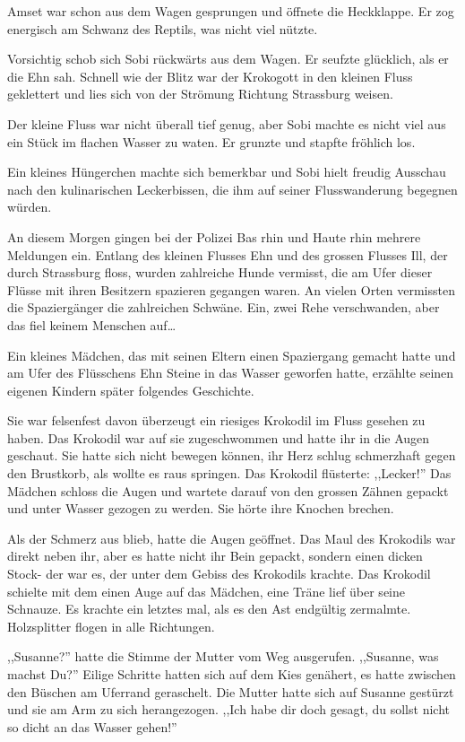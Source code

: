 Amset war schon aus dem Wagen gesprungen und öffnete die Heckklappe. Er zog energisch am Schwanz des Reptils, was nicht viel nützte.

Vorsichtig schob sich Sobi rückwärts aus dem Wagen. Er seufzte glücklich, als er die Ehn sah. Schnell wie der Blitz war der Krokogott in den kleinen Fluss geklettert und lies sich von der Strömung Richtung Strassburg weisen.

Der kleine Fluss war nicht überall tief genug, aber Sobi machte es nicht viel aus ein Stück im flachen Wasser zu waten. Er grunzte und stapfte fröhlich los.

Ein kleines Hüngerchen machte sich bemerkbar und Sobi hielt freudig Ausschau nach den kulinarischen Leckerbissen, die ihm auf seiner Flusswanderung begegnen würden. 

\sterne

An diesem Morgen gingen bei der Polizei Bas rhin und Haute rhin mehrere Meldungen ein. Entlang des kleinen Flusses Ehn und des grossen Flusses Ill, der durch Strassburg floss, wurden zahlreiche Hunde vermisst, die am Ufer dieser Flüsse mit ihren Besitzern spazieren gegangen waren. An vielen Orten vermissten die Spaziergänger die zahlreichen Schwäne. Ein, zwei Rehe verschwanden, aber das fiel keinem Menschen auf\dots 

Ein kleines Mädchen, das mit seinen Eltern einen Spaziergang gemacht hatte und am Ufer des Flüsschens Ehn Steine in das Wasser geworfen hatte, erzählte seinen eigenen Kindern später folgendes Geschichte. 

Sie war felsenfest davon überzeugt ein riesiges Krokodil im Fluss gesehen zu haben. Das Krokodil war auf sie zugeschwommen und hatte ihr in die Augen geschaut. Sie hatte sich nicht bewegen können, ihr Herz schlug schmerzhaft gegen den Brustkorb, als wollte es raus springen. Das Krokodil flüsterte: ,,Lecker!'' Das Mädchen schloss die Augen und wartete darauf von den grossen Zähnen gepackt und unter Wasser gezogen zu werden. Sie hörte ihre Knochen brechen.

Als der Schmerz aus blieb, hatte die Augen geöffnet. Das Maul des Krokodils war direkt neben ihr, aber es hatte nicht ihr Bein gepackt, sondern einen dicken Stock- der war es, der unter dem Gebiss des Krokodils krachte.
Das Krokodil schielte mit dem einen Auge auf das Mädchen, eine Träne lief über seine Schnauze. Es krachte ein letztes mal, als es den Ast endgültig zermalmte. Holzsplitter flogen in alle Richtungen.

,,Susanne?'' hatte die Stimme der Mutter vom Weg ausgerufen. ,,Susanne, was machst Du?'' Eilige Schritte hatten sich auf dem Kies genähert, es hatte zwischen den Büschen am Uferrand geraschelt. Die Mutter hatte sich auf Susanne gestürzt und sie am Arm zu sich herangezogen. ,,Ich habe dir doch gesagt, du sollst nicht so dicht an das Wasser gehen!''

